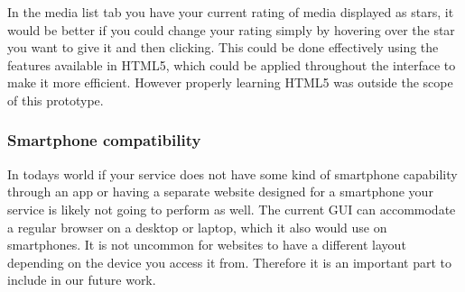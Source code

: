 In the media list tab you have your current rating of media displayed as stars, it would be better if you could change your rating simply by hovering over the star you want to give it and then clicking. This could be done effectively using the features available in HTML5, which could be applied throughout the interface to make it more efficient. However properly learning HTML5 was outside the scope of this prototype.

\subsubsection{Smartphone compatibility}
In todays world if your service does not have some kind of smartphone capability through an app or having a separate website designed for a smartphone your service is likely not going to perform as well. The current GUI can accommodate a regular browser on a desktop or laptop, which it also would use on smartphones. It is not uncommon for websites to have a different layout depending on the device you access it from. Therefore it is an important part to include in our future work.
